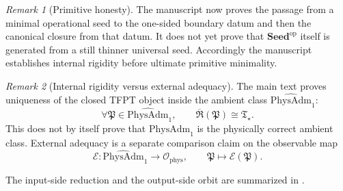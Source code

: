 \documentclass[11pt,a4paper]{article}
\theoremstyle{definition}
\theoremstyle{remark}
\newtheorem*{remark}{Remark}
\newcommand{\Tstar}{\mathfrak T_{\star}}
\newcommand{\PhysAdmOne}{\widehat{\mathrm{PhysAdm}}_1}
\newcommand{\Runiv}{\mathfrak R}
\newcommand{\Runivrig}{\overline{\Runiv}}
\newcommand{\Seedop}{\mathbf{Seed}^{\mathrm{op}}}
\begin{document}
\begin{remark}[Primitive honesty]
The manuscript now proves the passage from a minimal operational seed to the one-sided boundary
datum and then the canonical closure from that datum. It does not yet prove that $\Seedop$ itself is
generated from a still thinner universal seed. Accordingly the manuscript establishes internal
rigidity before ultimate primitive minimality.
\end{remark}

\begin{remark}[Internal rigidity versus external adequacy]
The main text proves uniqueness of the closed TFPT object inside the ambient class $\PhysAdmOne$:
\[
\forall \mathfrak P\in\PhysAdmOne,\qquad
\Runivrig(\mathfrak P)\cong \Tstar.
\]
This does not by itself prove that $\PhysAdmOne$ is the physically correct ambient class. External
adequacy is a separate comparison claim on the observable map
\[
\mathcal E:\PhysAdmOne\to\mathcal O_{\mathrm{phys}},
\qquad
\mathfrak P\longmapsto \mathcal E(\mathfrak P).
\]
\end{remark}

The input-side reduction and the output-side orbit are summarized in
.
\end{document}
